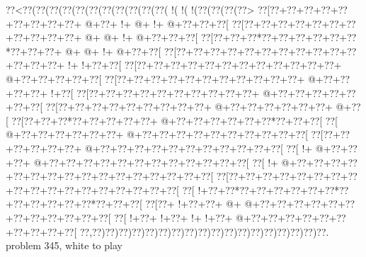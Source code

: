 \vbox{\vbox{\goo
\0??<\0??(\0??(\0??(\0??(\0??(\0??(\0??(\0??(\0??(\0??(\0??(\- !(\- !(\- !(\0??(\0??(\0??(\0??>
\0??[\0??+\0??+\0??+\0??+\0??+\0??+\0??+\0??+\0??+\- @+\0??+\- !+\- @+\- !+\- @+\0??+\0??+\0??[
\0??[\0??+\0??+\0??+\0??+\0??+\0??+\0??+\0??+\0??+\0??+\0??+\- @+\- @+\- !+\- @+\0??+\0??+\0??[
\0??[\0??+\0??+\0??*\0??+\0??+\0??+\0??+\0??+\0??*\0??+\0??+\0??+\- @+\- @+\- !+\- @+\0??+\0??[
\0??[\0??+\0??+\0??+\0??+\0??+\0??+\0??+\0??+\0??+\0??+\0??+\0??+\0??+\0??+\- !+\- !+\0??+\0??[
\0??[\0??+\0??+\0??+\0??+\0??+\0??+\0??+\0??+\0??+\0??+\0??+\0??+\- @+\0??+\0??+\0??+\0??+\0??[
\0??[\0??+\0??+\0??+\0??+\0??+\0??+\0??+\0??+\0??+\0??+\0??+\- @+\0??+\0??+\0??+\0??+\- !+\0??[
\0??[\0??+\0??+\0??+\0??+\0??+\0??+\0??+\0??+\0??+\0??+\- @+\0??+\0??+\0??+\0??+\0??+\0??+\0??[
\0??[\0??+\0??+\0??+\0??+\0??+\0??+\0??+\0??+\0??+\- @+\0??+\0??+\0??+\0??+\0??+\0??+\- @+\0??[
\0??[\0??+\0??+\0??*\0??+\0??+\0??+\0??+\0??+\- @+\0??+\0??+\0??+\0??+\0??+\0??*\0??+\0??+\0??[
\0??[\- @+\0??+\0??+\0??+\0??+\0??+\0??+\- @+\0??+\0??+\0??+\0??+\0??+\0??+\0??+\0??+\0??+\0??[
\0??[\0??+\0??+\0??+\0??+\0??+\0??+\- @+\0??+\0??+\0??+\0??+\0??+\0??+\0??+\0??+\0??+\0??+\0??[
\0??[\- !+\- @+\0??+\0??+\0??+\- @+\0??+\0??+\0??+\0??+\0??+\0??+\0??+\0??+\0??+\0??+\0??+\0??[
\0??[\- !+\- @+\0??+\0??+\0??+\0??+\0??+\0??+\0??+\0??+\0??+\0??+\0??+\0??+\0??+\0??+\0??+\0??[
\0??[\0??+\0??+\0??+\0??+\0??+\0??+\0??+\0??+\0??+\0??+\0??+\0??+\0??+\0??+\0??+\0??+\0??+\0??[
\0??[\- !+\0??+\0??*\0??+\0??+\0??+\0??+\0??+\0??*\0??+\0??+\0??+\0??+\0??+\0??*\0??+\0??+\0??[
\0??[\0??+\- !+\0??+\0??+\- @+\- @+\0??+\0??+\0??+\0??+\0??+\0??+\0??+\0??+\0??+\0??+\0??+\0??[
\0??[\- !+\0??+\- !+\0??+\- !+\- !+\0??+\- @+\0??+\0??+\0??+\0??+\0??+\0??+\0??+\0??+\0??+\0??[
\0??,\0??)\0??)\0??)\0??)\0??)\0??)\0??)\0??)\0??)\0??)\0??)\0??)\0??)\0??)\0??)\0??)\0??)\0??.
}
\hfil problem 345, white to play\hfil\break
}

